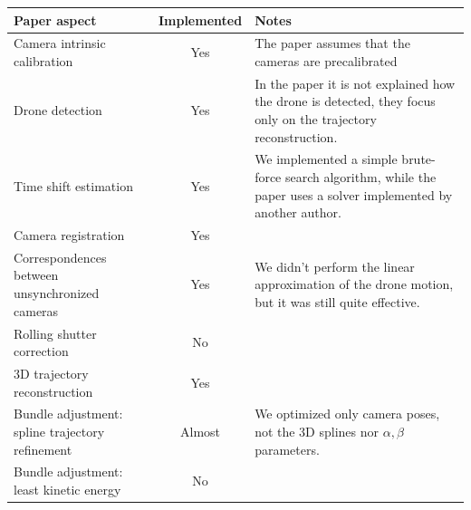 \documentclass[11pt]{article}
\begin{document}
\begin{table}[h]
    \centering
    \renewcommand{\arraystretch}{1.2}
    \begin{tabularx}{\textwidth}{|Y|c|Y|}
        \hline
        \textbf{Paper aspect}                           & \textbf{Implemented} & \textbf{Notes}                                                                                                     \\
        \hline
        Camera intrinsic calibration                    & Yes                  & The paper assumes that the cameras are precalibrated                                                               \\ \hline
        Drone detection                                 & Yes                  & In the paper it is not explained how the drone is detected, they focus only on the trajectory reconstruction.      \\\hline
        Time shift estimation                           & Yes                  & We implemented a simple brute-force search algorithm, while the paper uses a solver implemented by another author. \\\hline
        Camera registration                             & Yes                  &                                                                                                                    \\\hline
        Correspondences between unsynchronized cameras  & Yes                  & We didn't perform the linear approximation of the drone motion, but it was still quite effective.                  \\\hline
        Rolling shutter correction                      & No                   &                                                                                                                    \\\hline
        3D trajectory reconstruction                    & Yes                  &                                                                                                                    \\\hline
        Bundle adjustment: spline trajectory refinement & Almost               & We optimized only camera poses, not the 3D splines nor $\alpha,\beta$ parameters.                                  \\\hline
        Bundle adjustment: least kinetic energy         & No                   &                                                                                                                    \\\hline

\end{tabularx}
\end{table}
\end{document}
